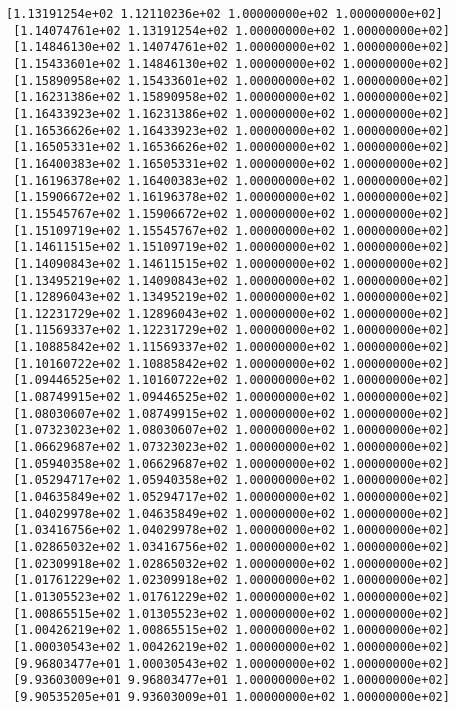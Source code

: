\documentclass[11pt]{article}
\begin{document}
\begin{Verbatim}[commandchars=\\\{\}]
 [1.13191254e+02 1.12110236e+02 1.00000000e+02 1.00000000e+02]
 [1.14074761e+02 1.13191254e+02 1.00000000e+02 1.00000000e+02]
 [1.14846130e+02 1.14074761e+02 1.00000000e+02 1.00000000e+02]
 [1.15433601e+02 1.14846130e+02 1.00000000e+02 1.00000000e+02]
 [1.15890958e+02 1.15433601e+02 1.00000000e+02 1.00000000e+02]
 [1.16231386e+02 1.15890958e+02 1.00000000e+02 1.00000000e+02]
 [1.16433923e+02 1.16231386e+02 1.00000000e+02 1.00000000e+02]
 [1.16536626e+02 1.16433923e+02 1.00000000e+02 1.00000000e+02]
 [1.16505331e+02 1.16536626e+02 1.00000000e+02 1.00000000e+02]
 [1.16400383e+02 1.16505331e+02 1.00000000e+02 1.00000000e+02]
 [1.16196378e+02 1.16400383e+02 1.00000000e+02 1.00000000e+02]
 [1.15906672e+02 1.16196378e+02 1.00000000e+02 1.00000000e+02]
 [1.15545767e+02 1.15906672e+02 1.00000000e+02 1.00000000e+02]
 [1.15109719e+02 1.15545767e+02 1.00000000e+02 1.00000000e+02]
 [1.14611515e+02 1.15109719e+02 1.00000000e+02 1.00000000e+02]
 [1.14090843e+02 1.14611515e+02 1.00000000e+02 1.00000000e+02]
 [1.13495219e+02 1.14090843e+02 1.00000000e+02 1.00000000e+02]
 [1.12896043e+02 1.13495219e+02 1.00000000e+02 1.00000000e+02]
 [1.12231729e+02 1.12896043e+02 1.00000000e+02 1.00000000e+02]
 [1.11569337e+02 1.12231729e+02 1.00000000e+02 1.00000000e+02]
 [1.10885842e+02 1.11569337e+02 1.00000000e+02 1.00000000e+02]
 [1.10160722e+02 1.10885842e+02 1.00000000e+02 1.00000000e+02]
 [1.09446525e+02 1.10160722e+02 1.00000000e+02 1.00000000e+02]
 [1.08749915e+02 1.09446525e+02 1.00000000e+02 1.00000000e+02]
 [1.08030607e+02 1.08749915e+02 1.00000000e+02 1.00000000e+02]
 [1.07323023e+02 1.08030607e+02 1.00000000e+02 1.00000000e+02]
 [1.06629687e+02 1.07323023e+02 1.00000000e+02 1.00000000e+02]
 [1.05940358e+02 1.06629687e+02 1.00000000e+02 1.00000000e+02]
 [1.05294717e+02 1.05940358e+02 1.00000000e+02 1.00000000e+02]
 [1.04635849e+02 1.05294717e+02 1.00000000e+02 1.00000000e+02]
 [1.04029978e+02 1.04635849e+02 1.00000000e+02 1.00000000e+02]
 [1.03416756e+02 1.04029978e+02 1.00000000e+02 1.00000000e+02]
 [1.02865032e+02 1.03416756e+02 1.00000000e+02 1.00000000e+02]
 [1.02309918e+02 1.02865032e+02 1.00000000e+02 1.00000000e+02]
 [1.01761229e+02 1.02309918e+02 1.00000000e+02 1.00000000e+02]
 [1.01305523e+02 1.01761229e+02 1.00000000e+02 1.00000000e+02]
 [1.00865515e+02 1.01305523e+02 1.00000000e+02 1.00000000e+02]
 [1.00426219e+02 1.00865515e+02 1.00000000e+02 1.00000000e+02]
 [1.00030543e+02 1.00426219e+02 1.00000000e+02 1.00000000e+02]
 [9.96803477e+01 1.00030543e+02 1.00000000e+02 1.00000000e+02]
 [9.93603009e+01 9.96803477e+01 1.00000000e+02 1.00000000e+02]
 [9.90535205e+01 9.93603009e+01 1.00000000e+02 1.00000000e+02]

\end{Verbatim}
\end{document}
